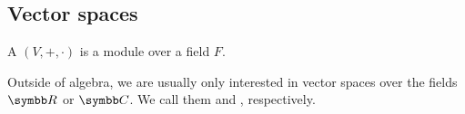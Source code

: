 \subsection{Vector spaces}\label{sec:vector_spaces}

\begin{definition}\label{def:vector_space}
  A  \( (V, +, \cdot) \) is a module over a field \( F \).
\end{definition}

\begin{note}\label{note:real_vector_space}
  Outside of algebra, we are usually only interested in vector spaces over the fields \( \BB{R} \) or \( \BB{C} \). We call them  and , respectively.
\end{note}

